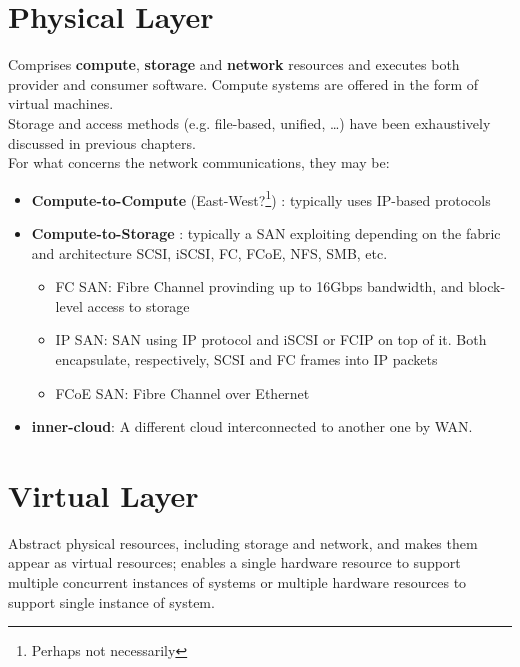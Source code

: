 \section{Physical Layer}
Comprises \textbf{compute}, \textbf{storage} and \textbf{network} resources and executes both provider and consumer software. Compute systems are offered in the form of virtual machines.\\
Storage and access methods (e.g. file-based, unified, \dots) have been exhaustively discussed in previous chapters.\\
For what concerns the network communications, they may be:\ns
\begin{itemize}
   \item \textbf{Compute-to-Compute} (East-West?\footnote{Perhaps not necessarily}) : typically uses IP-based protocols
   \item \textbf{Compute-to-Storage} : typically a SAN exploiting depending on the fabric and architecture SCSI, iSCSI, FC, FCoE, NFS, SMB, etc.\\
   \begin{itemize}
      \item FC SAN: Fibre Channel provinding up to 16Gbps bandwidth, and block-level access to storage
      \item IP SAN: SAN using IP protocol and iSCSI or FCIP on top of it. Both encapsulate, respectively, SCSI and FC frames into IP packets
      \item FCoE SAN: Fibre Channel over Ethernet
   \end{itemize}
   \item \textbf{inner-cloud}: A different cloud interconnected to another one by WAN.
\end{itemize}

\section{Virtual Layer}
Abstract physical resources, including storage and network, and makes them appear as virtual resources;
enables a single hardware resource to support multiple concurrent instances of systems or multiple hardware resources to support single instance of system.
\nl

